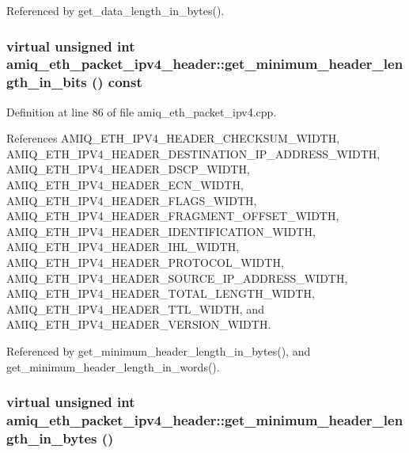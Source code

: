 Referenced by get\_\-data\_\-length\_\-in\_\-bytes().\hypertarget{classamiq__eth__packet__ipv4__header_a3e9b9781d9edc8dc3c6579439a9fb537}{
\subsubsection[{get\_\-minimum\_\-header\_\-length\_\-in\_\-bits}]{\setlength{\rightskip}{0pt plus 5cm}virtual unsigned int amiq\_\-eth\_\-packet\_\-ipv4\_\-header::get\_\-minimum\_\-header\_\-length\_\-in\_\-bits () const}}
\label{classamiq__eth__packet__ipv4__header_a3e9b9781d9edc8dc3c6579439a9fb537}


Definition at line 86 of file amiq\_\-eth\_\-packet\_\-ipv4.cpp.

References AMIQ\_\-ETH\_\-IPV4\_\-HEADER\_\-CHECKSUM\_\-WIDTH, AMIQ\_\-ETH\_\-IPV4\_\-HEADER\_\-DESTINATION\_\-IP\_\-ADDRESS\_\-WIDTH, AMIQ\_\-ETH\_\-IPV4\_\-HEADER\_\-DSCP\_\-WIDTH, AMIQ\_\-ETH\_\-IPV4\_\-HEADER\_\-ECN\_\-WIDTH, AMIQ\_\-ETH\_\-IPV4\_\-HEADER\_\-FLAGS\_\-WIDTH, AMIQ\_\-ETH\_\-IPV4\_\-HEADER\_\-FRAGMENT\_\-OFFSET\_\-WIDTH, AMIQ\_\-ETH\_\-IPV4\_\-HEADER\_\-IDENTIFICATION\_\-WIDTH, AMIQ\_\-ETH\_\-IPV4\_\-HEADER\_\-IHL\_\-WIDTH, AMIQ\_\-ETH\_\-IPV4\_\-HEADER\_\-PROTOCOL\_\-WIDTH, AMIQ\_\-ETH\_\-IPV4\_\-HEADER\_\-SOURCE\_\-IP\_\-ADDRESS\_\-WIDTH, AMIQ\_\-ETH\_\-IPV4\_\-HEADER\_\-TOTAL\_\-LENGTH\_\-WIDTH, AMIQ\_\-ETH\_\-IPV4\_\-HEADER\_\-TTL\_\-WIDTH, and AMIQ\_\-ETH\_\-IPV4\_\-HEADER\_\-VERSION\_\-WIDTH.

Referenced by get\_\-minimum\_\-header\_\-length\_\-in\_\-bytes(), and get\_\-minimum\_\-header\_\-length\_\-in\_\-words().\hypertarget{classamiq__eth__packet__ipv4__header_a9678136b08ef617c2b2db99745155207}{
\subsubsection[{get\_\-minimum\_\-header\_\-length\_\-in\_\-bytes}]{\setlength{\rightskip}{0pt plus 5cm}virtual unsigned int amiq\_\-eth\_\-packet\_\-ipv4\_\-header::get\_\-minimum\_\-header\_\-length\_\-in\_\-bytes ()}}
\label{classamiq__eth__packet__ipv4__header_a9678136b08ef617c2b2db99745155207}


